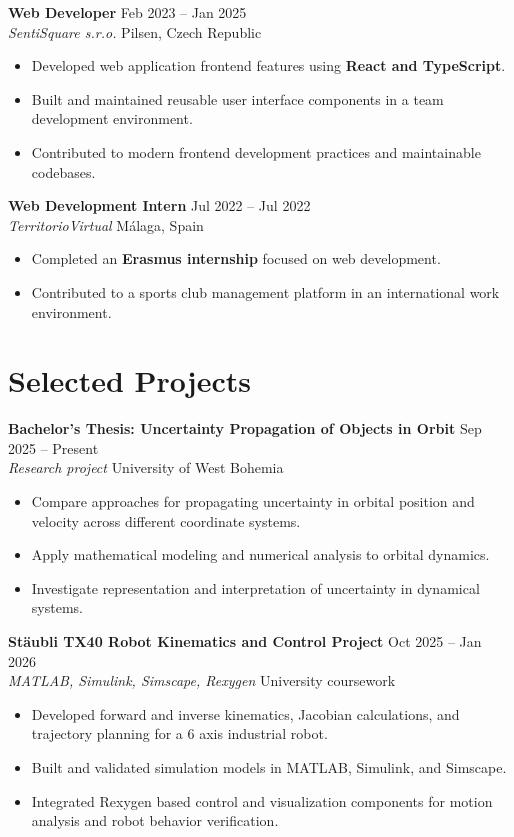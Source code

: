 \documentclass[11pt,a4paper]{article}
\newcommand{\entry}[4]{%
  \textbf{#1} \hfill {\small #2}\\
  {\textit{#3}} \hfill {\small\color{muted} #4}\\[-0.15em]
}
\begin{document}
\entry{Web Developer}{Feb 2023 -- Jan 2025}{SentiSquare s.r.o.}{Pilsen, Czech Republic}
\begin{itemize}
  \item Developed web application frontend features using \textbf{React and TypeScript}.
  \item Built and maintained reusable user interface components in a team development environment.
  \item Contributed to modern frontend development practices and maintainable codebases.
\end{itemize}

\entry{Web Development Intern}{Jul 2022 -- Jul 2022}{TerritorioVirtual}{M\'alaga, Spain}
\begin{itemize}
  \item Completed an \textbf{Erasmus internship} focused on web development.
  \item Contributed to a sports club management platform in an international work environment.
\end{itemize}

\newpage
\section*{Selected Projects}
\entry{Bachelor's Thesis: Uncertainty Propagation of Objects in Orbit}{Sep 2025 -- Present}{Research project}{University of West Bohemia}
\begin{itemize}
  \item Compare approaches for propagating uncertainty in orbital position and velocity across different coordinate systems.
  \item Apply mathematical modeling and numerical analysis to orbital dynamics.
  \item Investigate representation and interpretation of uncertainty in dynamical systems.
\end{itemize}

\entry{St\"aubli TX40 Robot Kinematics and Control Project}{Oct 2025 -- Jan 2026}{MATLAB, Simulink, Simscape, Rexygen}{University coursework}
\begin{itemize}
  \item Developed forward and inverse kinematics, Jacobian calculations, and trajectory planning for a 6 axis industrial robot.
  \item Built and validated simulation models in MATLAB, Simulink, and Simscape.
  \item Integrated Rexygen based control and visualization components for motion analysis and robot behavior verification.
\end{itemize}
\end{document}
